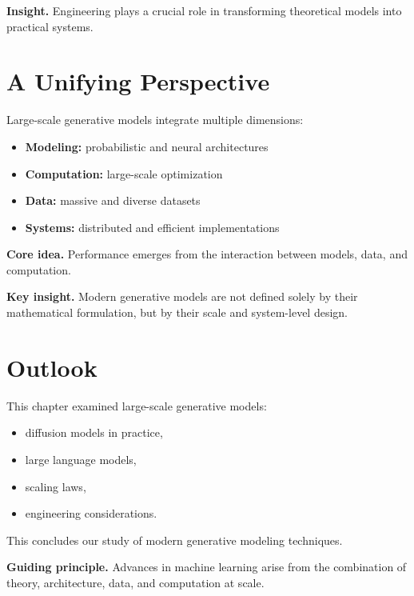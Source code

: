 \medskip

\noindent
\textbf{Insight.}  
Engineering plays a crucial role in transforming theoretical models into practical systems.

\section{A Unifying Perspective}

Large-scale generative models integrate multiple dimensions:

\begin{itemize}
    \item \textbf{Modeling:} probabilistic and neural architectures
    \item \textbf{Computation:} large-scale optimization
    \item \textbf{Data:} massive and diverse datasets
    \item \textbf{Systems:} distributed and efficient implementations
\end{itemize}

\medskip

\noindent
\textbf{Core idea.}  
Performance emerges from the interaction between models, data, and computation.

\medskip

\noindent
\textbf{Key insight.}  
Modern generative models are not defined solely by their mathematical formulation, but by their scale and system-level design.

\section{Outlook}

This chapter examined large-scale generative models:
\begin{itemize}
    \item diffusion models in practice,
    \item large language models,
    \item scaling laws,
    \item engineering considerations.
\end{itemize}

\medskip

This concludes our study of modern generative modeling techniques.

\medskip

\noindent
\textbf{Guiding principle.}  
Advances in machine learning arise from the combination of theory, architecture, data, and computation at scale.